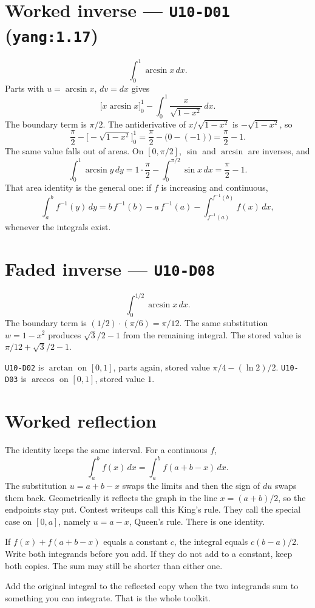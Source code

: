 \section{Worked inverse --- \texttt{U10-D01} (\texttt{yang:1.17})}
\[
\int_0^1\arcsin x\,dx.
\]
Parts with $u=\arcsin x$, $dv=dx$ gives
\[
\bigl[x\arcsin x\bigr]_0^1 - \int_0^1\frac{x}{\sqrt{1-x^2}}\,dx.
\]
The boundary term is $\pi/2$. The antiderivative of $x/\sqrt{1-x^2}$ is $-\sqrt{1-x^2}$, so
\[
\frac\pi2 - \bigl[-\sqrt{1-x^2}\bigr]_0^1 = \frac\pi2 - \bigl(0-(-1)\bigr) = \frac\pi2-1.
\]
The same value falls out of areas. On $[0,\pi/2]$, $\sin$ and $\arcsin$ are inverses, and
\[
\int_0^1\arcsin y\,dy = 1\cdot\frac\pi2 - \int_0^{\pi/2}\sin x\,dx = \frac\pi2-1.
\]
That area identity is the general one: if $f$ is increasing and continuous,
\[
\int_a^b f^{-1}(y)\,dy = b\,f^{-1}(b)-a\,f^{-1}(a)-\int_{f^{-1}(a)}^{f^{-1}(b)} f(x)\,dx,
\]
whenever the integrals exist.

\section{Faded inverse --- \texttt{U10-D08}}
\[
\int_0^{1/2}\arcsin x\,dx.
\]
The boundary term is $(1/2)\cdot(\pi/6)=\pi/12$. The same substitution $w=1-x^2$ produces $\sqrt3/2-1$ from the remaining integral. The stored value is $\pi/12+\sqrt3/2-1$.

\texttt{U10-D02} is $\arctan$ on $[0,1]$, parts again, stored value $\pi/4-(\ln 2)/2$. \texttt{U10-D03} is $\arccos$ on $[0,1]$, stored value $1$.

\section{Worked reflection}
The identity keeps the same interval. For a continuous $f$,
\[
\int_a^b f(x)\,dx=\int_a^b f(a+b-x)\,dx.
\]
The substitution $u=a+b-x$ swaps the limits and then the sign of $du$ swaps them back. Geometrically it reflects the graph in the line $x=(a+b)/2$, so the endpoints stay put. Contest writeups call this King's rule. They call the special case on $[0,a]$, namely $u=a-x$, Queen's rule. There is one identity.

If $f(x)+f(a+b-x)$ equals a constant $c$, the integral equals $c(b-a)/2$. Write both integrands before you add. If they do not add to a constant, keep both copies. The sum may still be shorter than either one.

Add the original integral to the reflected copy when the two integrands sum to something you can integrate. That is the whole toolkit.


